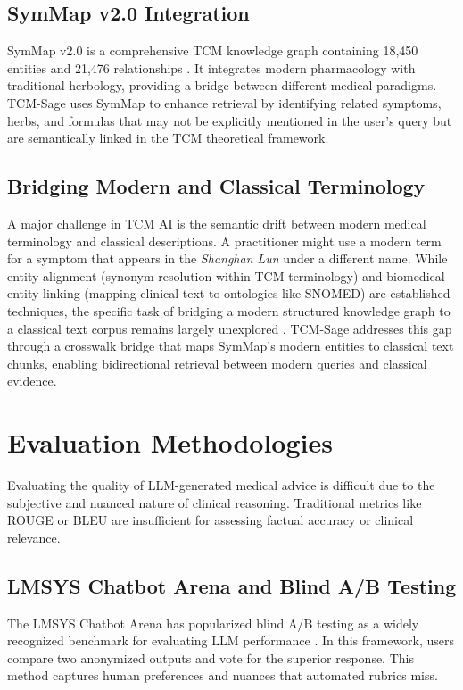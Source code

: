 \subsection{SymMap v2.0 Integration}

SymMap v2.0 is a comprehensive TCM knowledge graph containing 18,450 entities and 21,476 relationships \cite{symmap2020}. It integrates modern pharmacology with traditional herbology, providing a bridge between different medical paradigms. TCM-Sage uses SymMap to enhance retrieval by identifying related symptoms, herbs, and formulas that may not be explicitly mentioned in the user's query but are semantically linked in the TCM theoretical framework.

\subsection{Bridging Modern and Classical Terminology}

A major challenge in TCM AI is the semantic drift between modern medical terminology and classical descriptions. A practitioner might use a modern term for a symptom that appears in the \textit{Shanghan Lun} under a different name. While entity alignment (synonym resolution within TCM terminology) and biomedical entity linking (mapping clinical text to ontologies like SNOMED) are established techniques, the specific task of bridging a modern structured knowledge graph to a classical text corpus remains largely unexplored \cite{kg_tcm_classics2025}. TCM-Sage addresses this gap through a crosswalk bridge that maps SymMap's modern entities to classical text chunks, enabling bidirectional retrieval between modern queries and classical evidence.

\section{Evaluation Methodologies}

Evaluating the quality of LLM-generated medical advice is difficult due to the subjective and nuanced nature of clinical reasoning. Traditional metrics like ROUGE or BLEU are insufficient for assessing factual accuracy or clinical relevance.

\subsection{LMSYS Chatbot Arena and Blind A/B Testing}

The LMSYS Chatbot Arena has popularized blind A/B testing as a widely recognized benchmark for evaluating LLM performance \cite{chatbotarena2024}. In this framework, users compare two anonymized outputs and vote for the superior response. This method captures human preferences and nuances that automated rubrics miss.

